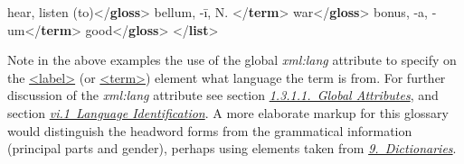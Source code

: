 \begin{shaded}
\mbox{}\newline 
\hspace*{1em}hear, listen (to){</\textbf{gloss}>}\mbox{}\newline 
{}\mbox{}\newline 
{}\mbox{}\newline 
\hspace*{1em}bellum, -ī, N. {</\textbf{term}>}\mbox{}\newline 
{}\mbox{}\newline 
{}\mbox{}\newline 
\hspace*{1em}war{</\textbf{gloss}>}\mbox{}\newline 
{}\mbox{}\newline 
{}\mbox{}\newline 
\hspace*{1em}bonus, -a, -um{</\textbf{term}>}\mbox{}\newline 
{}\mbox{}\newline 
{}\mbox{}\newline 
\hspace*{1em}good{</\textbf{gloss}>}\mbox{}\newline 
{}\mbox{}\newline 
{</\textbf{list}>}\end{shaded}\egroup\par \noindent  Note in the above examples the use of the global {\itshape xml:lang} attribute to specify on the \hyperref[TEI.label]{<label>} (or \hyperref[TEI.term]{<term>}) element what language the term is from. For further discussion of the {\itshape xml:lang} attribute see section \textit{\hyperref[STGA]{1.3.1.1.\ Global Attributes}}, and section \textit{\hyperref[CHSH]{vi.1\ Language Identification}}. A more elaborate markup for this glossary would distinguish the headword forms from the grammatical information (principal parts and gender), perhaps using elements taken from \textit{\hyperref[DI]{9.\ Dictionaries}}.\par
